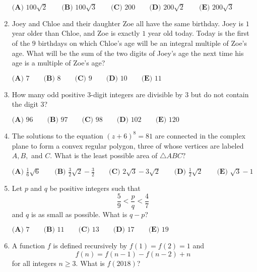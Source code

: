 \documentclass{article}
\begin{document}
\begin{enumerate}[label=\arabic*., itemsep=0.5em]
\(\textbf{(A) }100\sqrt{2}\qquad\textbf{(B) }100\sqrt{3}\qquad\textbf{(C) }200\qquad\textbf{(D) }200\sqrt{2}\qquad\textbf{(E) }200\sqrt{3}\)\par \vspace{0.5em}\item Joey and Chloe and their daughter Zoe all have the same birthday. Joey is \(1\) year older than Chloe, and Zoe is exactly \(1\) year old today. Today is the first of the \(9\) birthdays on which Chloe's age will be an integral multiple of Zoe's age. What will be the sum of the two digits of Joey's age the next time his age is a multiple of Zoe's age?

\(
\textbf{(A) }7 \qquad
\textbf{(B) }8 \qquad
\textbf{(C) }9 \qquad
\textbf{(D) }10 \qquad
\textbf{(E) }11 \qquad
\)\par \vspace{0.5em}\item How many odd positive \(3\)-digit integers are divisible by \(3\) but do not contain the digit \(3\)?

\(\textbf{(A) } 96 \qquad \textbf{(B) } 97 \qquad \textbf{(C) } 98 \qquad \textbf{(D) } 102 \qquad \textbf{(E) } 120 \)\par \vspace{0.5em}\item The solutions to the equation \((z+6)^8=81\) are connected in the complex plane to form a convex regular polygon, three of whose vertices are labeled \(A,B,\) and \(C\). What is the least possible area of \(\triangle ABC?\)

\(\textbf{(A) } \frac{1}{6}\sqrt{6} \qquad \textbf{(B) } \frac{3}{2}\sqrt{2}-\frac{3}{2} \qquad \textbf{(C) } 2\sqrt3-3\sqrt2 \qquad \textbf{(D) } \frac{1}{2}\sqrt{2} \qquad \textbf{(E) } \sqrt 3-1\)\par \vspace{0.5em}\item Let \(p\) and \(q\) be positive integers such that 
\begin{equation*}
\frac{5}{9} < \frac{p}{q} < \frac{4}{7}
\end{equation*}
and \(q\) is as small as possible. What is \(q-p\)?

\(\textbf{(A) } 7 \qquad \textbf{(B) } 11 \qquad \textbf{(C) } 13 \qquad \textbf{(D) } 17 \qquad \textbf{(E) } 19 \)\par \vspace{0.5em}\item A function \(f\) is defined recursively by \(f(1)=f(2)=1\) and 
\begin{equation*}
f(n)=f(n-1)-f(n-2)+n
\end{equation*}
for all integers \(n \geq 3\). What is \(f(2018)\)?


\end{enumerate}
\end{document}
